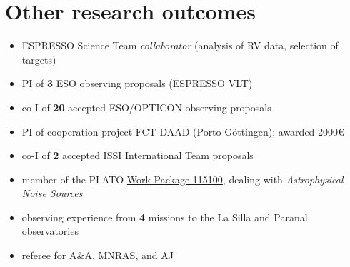\documentclass[10pt]{article}
\begin{document}
\fi


\ifoutcomes

\section{Other research outcomes}

\begin{itemize}\itemsep-0.3em
  \item ESPRESSO Science Team \textit{collaborator} (analysis of RV data, selection of targets)
  \item PI of \textbf{3} ESO observing proposals (ESPRESSO\,\raisebox{0.8\depth}{@}\,VLT)
  \item co-I of \textbf{20} accepted ESO/OPTICON observing proposals
  \item PI of cooperation project FCT-DAAD (Porto-Göttingen); awarded 2000€
  \item co-I of \textbf{2} accepted ISSI International Team proposals
  \item member of the PLATO 
  \href{https://warwick.ac.uk/fac/sci/physics/research/astro/plato-science/research/researchareas/exoplanets/wp115100}{Work Package 115100},
  dealing with \emph{Astrophysical Noise Sources}
  \item observing experience from \textbf{4} missions to the La Silla and Paranal observatories
  \item referee for A\&A, MNRAS, and AJ

\end{itemize}

\fi





\ifoutreach
\end{document}

